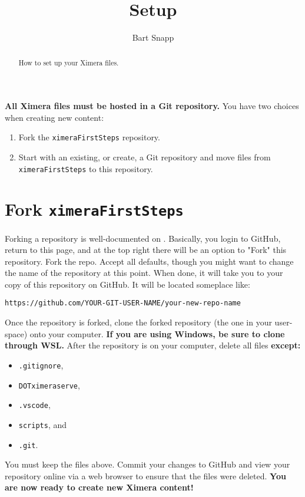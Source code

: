 \documentclass{ximera}
\title{Setup}
\author{Bart Snapp}
\begin{document}
\begin{abstract}
  How to set up your Ximera files.
\end{abstract}
\maketitle

\textbf{All Ximera files must be hosted in a Git repository.} You have two
choices when creating new content:
\begin{enumerate}
  \item Fork the \texttt{ximeraFirstSteps} repository.
  \item Start with an existing, or create, a Git repository and move files
        from \texttt{ximeraFirstSteps} to this repository.
\end{enumerate}

\section{Fork \texttt{ximeraFirstSteps}}

Forking a repository is well-documented on
.
Basically, you login to GitHub, return to this page, and at the top right there
will be an option to "Fork" this repository. Fork the repo. Accept all
defaults, though you might want to change the name of the repository at this
point. When done, it will take you to
your copy of this repository on GitHub. It will be located someplace like:
\begin{center}
  \texttt{https://github.com/YOUR-GIT-USER-NAME/your-new-repo-name}
\end{center}
Once the repository is forked, clone the forked repository (the one in your
user-space) onto your computer. \textbf{If you are using Windows, be sure to
  clone through WSL.}
After the repository is on your computer, delete all files \textbf{except:}
\begin{itemize}
  \item \verb|.gitignore|,
  \item \verb|DOTximeraserve|,
  \item \verb|.vscode|,
  \item \verb|scripts|, and
  \item \verb|.git|.
\end{itemize}
You must keep the files above.	Commit your changes to GitHub and view your
repository online via a web browser to ensure that the files were deleted.
\textbf{You are now ready to create new Ximera content!}
\end{document}
